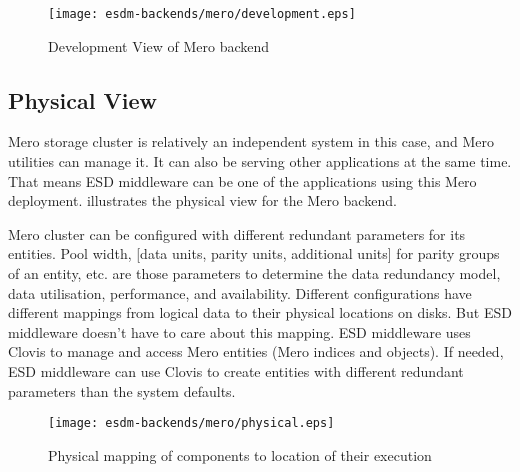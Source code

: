 \begin{figure}
	\centering
	\texttt{[image: esdm-backends/mero/development.eps]}
	\caption{Development View of Mero backend}
	\label{fig:mero backend development view}
\end{figure}


\subsection{Physical View}

Mero storage cluster is relatively an independent system in this case, and Mero utilities can manage it. It can also be serving other applications at the
same time. That means ESD middleware can be one of the applications using
this Mero deployment.
 illustrates the physical view for the Mero backend.

Mero cluster can be configured with different redundant parameters for its
entities. Pool width, [data units, parity units, additional units] for parity
groups of an entity, etc. are those parameters to determine the data redundancy
model, data utilisation, performance, and availability. Different configurations
have different mappings from logical data to their physical locations on disks.
But ESD middleware doesn't have to care about this mapping. ESD middleware uses
Clovis to manage and access Mero entities (Mero indices and objects).
If needed, ESD middleware can use Clovis to create entities with different redundant parameters than the system defaults.

\begin{figure}
	\centering
	\texttt{[image: esdm-backends/mero/physical.eps]}
	\caption{Physical mapping of components to location of their execution}
	\label{fig:backend mero physical view}
\end{figure}
